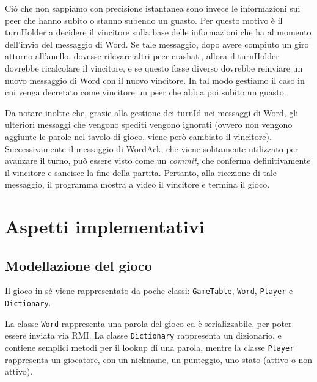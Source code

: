 \documentclass[9pt]{article}
\begin{document}
Ciò che non sappiamo con precisione istantanea sono invece le informazioni sui peer che hanno subito o stanno subendo un guasto. Per questo motivo è il turnHolder a decidere il vincitore sulla base delle informazioni che ha al momento dell'invio del messaggio di Word. Se tale messaggio, dopo avere compiuto un giro attorno all'anello, dovesse rilevare altri peer crashati, allora il turnHolder dovrebbe ricalcolare il vincitore, e se questo fosse diverso dovrebbe reinviare un nuovo messaggio di Word con il nuovo vincitore. In tal modo gestiamo il caso in cui venga decretato come vincitore un peer che abbia poi subito un guasto.

Da notare inoltre che, grazie alla gestione dei turnId nei messaggi di Word, gli ulteriori messaggi che vengono spediti vengono ignorati (ovvero non vengono aggiunte le parole nel tavolo di gioco, viene però cambiato il vincitore). Successivamente il messaggio di WordAck, che viene solitamente utilizzato per avanzare il turno, può essere visto come un \emph{commit}, che conferma definitivamente il vincitore e sancisce la fine della partita. Pertanto, alla ricezione di tale messaggio, il programma mostra a video il vincitore e termina il gioco.

\section{Aspetti implementativi}


\subsection{Modellazione del gioco}

Il gioco in sé viene rappresentato da poche classi: \texttt{GameTable}, \texttt{Word}, \texttt{Player} e \texttt{Dictionary}.

La classe \texttt{Word} rappresenta una parola del gioco ed è serializzabile, per poter essere inviata via RMI. La classe \texttt{Dictionary} rappresenta un dizionario, e contiene semplici metodi per il lookup di una parola, mentre la classe \texttt{Player} rappresenta un giocatore, con un nickname, un punteggio, uno stato (attivo o non attivo).
\end{document}
